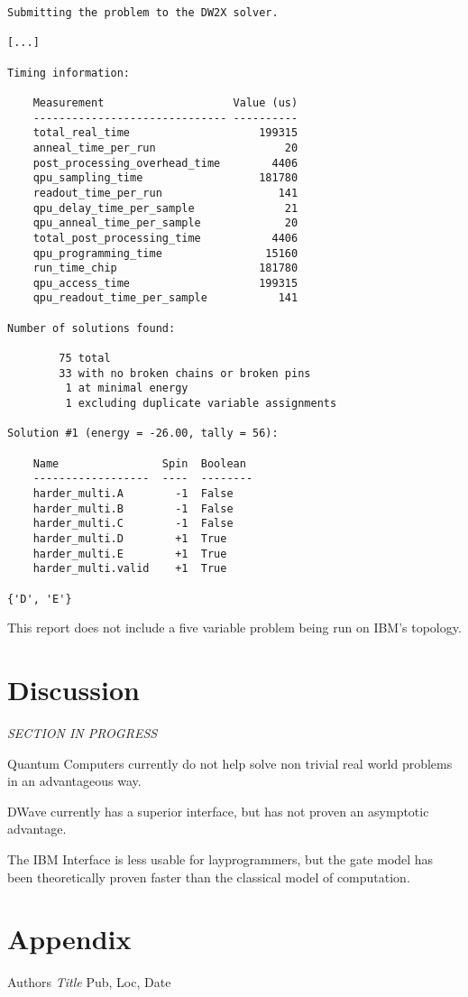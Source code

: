 \documentclass{article}
\begin{document}
\begin{verbatim}
Submitting the problem to the DW2X solver.

[...]

Timing information:

    Measurement                    Value (us)
    ------------------------------ ----------
    total_real_time                    199315
    anneal_time_per_run                    20
    post_processing_overhead_time        4406
    qpu_sampling_time                  181780
    readout_time_per_run                  141
    qpu_delay_time_per_sample              21
    qpu_anneal_time_per_sample             20
    total_post_processing_time           4406
    qpu_programming_time                15160
    run_time_chip                      181780
    qpu_access_time                    199315
    qpu_readout_time_per_sample           141

Number of solutions found:

        75 total
        33 with no broken chains or broken pins
         1 at minimal energy
         1 excluding duplicate variable assignments

Solution #1 (energy = -26.00, tally = 56):

    Name                Spin  Boolean
    ------------------  ----  --------
    harder_multi.A        -1  False  
    harder_multi.B        -1  False  
    harder_multi.C        -1  False  
    harder_multi.D        +1  True   
    harder_multi.E        +1  True   
    harder_multi.valid    +1  True    

{'D', 'E'}
\end{verbatim}

This report does not include a five variable problem being run on IBM's topology.

\section{Discussion}

\textit{SECTION IN PROGRESS}

Quantum Computers currently do not help solve non trivial real world problems in an advantageous way.

DWave currently has a superior interface, but has not proven an asymptotic advantage.

The IBM Interface is less usable for layprogrammers, but the gate model has been theoretically proven faster than the classical model of computation. 

\section{Appendix}

\begin{thebibliography}{9}
        Authors
        \textit{Title}
        Pub, Loc, Date
\end{thebibliography}
\end{document}
